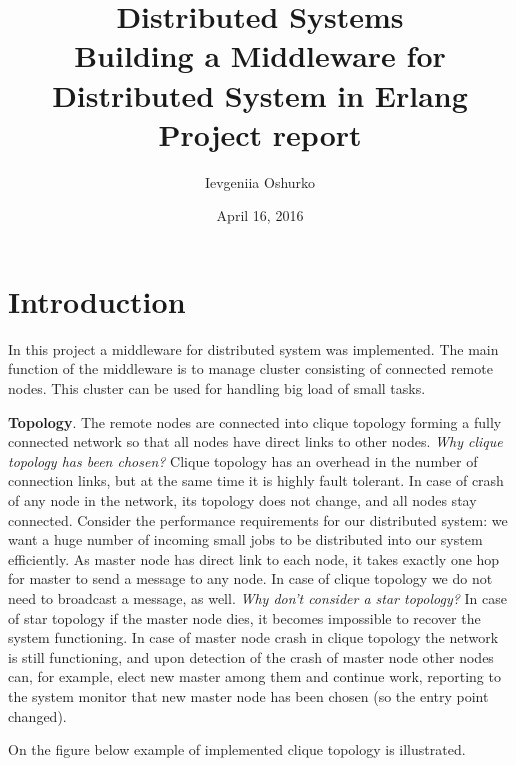 \documentclass[12pt]{article}
\newcommand\MyFive[2]{%
  \foreach \x in {1,...,5}{
    \pgfmathparse{(\x-1)*72+floor(\x/6)*36 + 90 - 90*#2}
    \node[draw,circle,inner sep=5pt,text width=1cm, align=center] (#1-\x) at (\pgfmathresult:2.5cm){ \ifthenelse{1 = \x}{Master Node}{Node $\x$}};
  }
  \foreach \x [count=\xi from 1] in {1,...,5}{
    \foreach \y in {\x,...,5}{
    \path (#1-\xi) edge[-] (#1-\y);
  }
}
}
\begin{document}
\title{
Distributed Systems \\
\textbf{Building a Middleware for Distributed System in Erlang}\\
Project report
}

\author{Ievgeniia Oshurko}
\date{April 16, 2016}
\maketitle


\section{Introduction}

In this project a middleware for distributed system was implemented. The main function of the middleware is to manage cluster consisting of connected remote nodes. This cluster can be used for handling big load of small tasks. 


\textbf{Topology}. The remote nodes are connected into clique topology forming a fully connected network so that all nodes have direct links to other nodes. \emph{Why clique topology has been chosen?} Clique topology has an overhead in the number of  connection links, but at the same time it is highly fault tolerant. In case of crash of any node in the network, its topology does not change, and all nodes stay connected. Consider the performance requirements for our distributed system: we want a huge number of incoming small jobs to be distributed into our system efficiently. As master node has direct link to each node, it takes exactly one hop for master to send a message to any node. In case of clique topology we do not need to broadcast a message, as well. \emph{Why don't consider a star topology?} In case of star topology if the master node dies, it becomes impossible to recover the system functioning. In case of master node crash in clique topology the network is still functioning, and upon detection of the crash of master node other nodes can, for example, elect new master among them and continue work, reporting to the system monitor that new master node has been chosen (so the entry point changed).

On the figure below example of implemented clique topology is illustrated. 

	\begin{center}
	\end{center}
\end{document}
